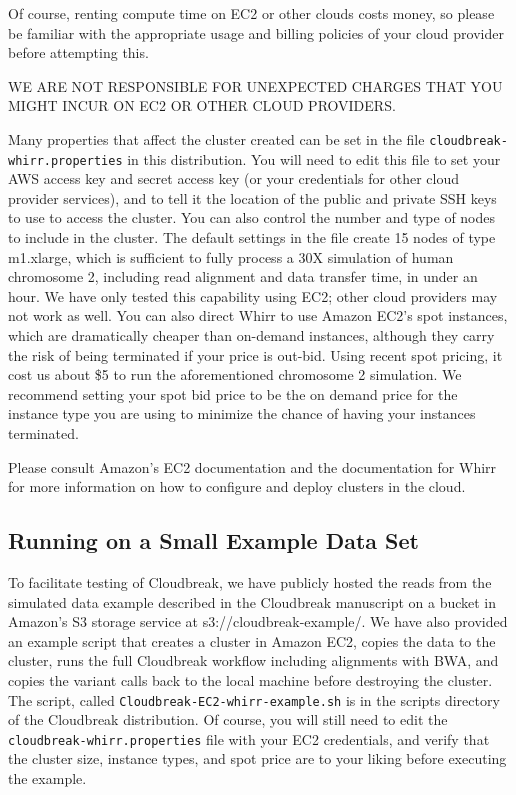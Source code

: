 \documentclass[11pt]{article}
\begin{document}
Of course, renting compute time on EC2 or other clouds costs money, so please be
familiar with the appropriate usage and billing policies of your cloud provider
before attempting this.

WE ARE NOT RESPONSIBLE FOR UNEXPECTED CHARGES THAT YOU MIGHT INCUR ON EC2 OR
OTHER CLOUD PROVIDERS.

Many properties that affect the cluster created can be set in the file
\texttt{cloudbreak-whirr.properties} in this distribution. You will need to edit this file
to set your AWS access key and secret access key (or your credentials for other
cloud provider services), and to tell it the location of the public and
private SSH keys to use to access the cluster. You can also control the number
and type of nodes to include in the cluster. The default settings in the file
create 15 nodes of type m1.xlarge, which is sufficient to fully process a 30X
simulation of human chromosome 2, including read alignment and data transfer time,
in under an hour. We have only tested this capability using EC2; other cloud providers
may not work as well. You can also direct Whirr to use Amazon EC2's spot instances, which are
dramatically cheaper than on-demand instances, although they carry the risk of
being terminated if your price is out-bid. Using recent spot pricing, it cost
us about \$5 to run the aforementioned chromosome 2 simulation. We recommend
setting your spot bid price to be the on demand price for the instance type you
are using to minimize the chance of having your instances terminated.

Please consult Amazon's EC2 documentation and the documentation for Whirr for
more information on how to configure and deploy clusters in the cloud.

\subsection{Running on a Small Example Data Set}
\label{runningonasmallexampledataset}

To facilitate testing of Cloudbreak, we have publicly hosted the reads from the simulated
data example described in the Cloudbreak manuscript on a bucket in Amazon's S3 storage
 service at s3:/\slash cloudbreak-example\slash . We have also provided an example script that creates
 a cluster in Amazon EC2, copies the data to the cluster, runs the full Cloudbreak
 workflow including alignments with BWA, and copies the variant calls back to the
 local machine before destroying the cluster. The script, called \texttt{Cloudbreak-EC2-whirr-example.sh}
 is in the scripts directory of the Cloudbreak distribution. Of course, you will still
 need to edit the \texttt{cloudbreak-whirr.properties} file with your EC2 credentials, and verify
 that the cluster size, instance types, and spot price are to your liking before
 executing the example.
\end{document}
